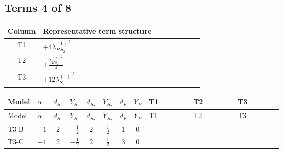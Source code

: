 \documentclass[8pt]{article}
\begin{document}
\begin{landscape}
\subsection*{Terms 4 of 8}
\begin{center}
\begin{tabular}{@{}c >{\raggedright\arraybackslash}p{0.82\linewidth}@{}}
\toprule
Column & Representative term structure \\
\midrule
T1 & \(\displaystyle +4 {\lambda_{HS_2}^{(1)}}^2\) \\
\midrule
T2 & \(\displaystyle +\frac{{\lambda_{HS_2}^{(A)}}^2}{4}\) \\
\midrule
T3 & \(\displaystyle +12 {\lambda_{S_2}^{(1)}}^2\) \\
\midrule
\bottomrule
\end{tabular}
\end{center}
\smallskip
\tiny
\begin{longtable}{@{}llcccccc >{\raggedright\arraybackslash}p{0.21\linewidth} >{\raggedright\arraybackslash}p{0.21\linewidth} >{\raggedright\arraybackslash}p{0.21\linewidth}@{}}
\toprule
Model & $\alpha$ & $d_{S_1}$ & $Y_{S_1}$ & $d_{S_2}$ & $Y_{S_2}$ & $d_F$ & $Y_F$ & T1 & T2 & T3 \\
\midrule
\endfirsthead
\toprule
Model & $\alpha$ & $d_{S_1}$ & $Y_{S_1}$ & $d_{S_2}$ & $Y_{S_2}$ & $d_F$ & $Y_F$ & T1 & T2 & T3 \\
\midrule
\endhead
T3-B & $-1$ & $2$ & $-\frac{1}{2}$ & $2$ & $\frac{1}{2}$ & $1$ & $0$ & \scriptsize\adjustbox{max width=\linewidth}{$\begin{gathered} +4 {\lambda_{HS_2}^{(1)}}^2\end{gathered}$} & \scriptsize\adjustbox{max width=\linewidth}{$\begin{gathered} +\frac{{\lambda_{HS_2}^{(A)}}^2}{4}\end{gathered}$} & \scriptsize\adjustbox{max width=\linewidth}{$\begin{gathered} +12 {\lambda_{S_2}^{(1)}}^2\end{gathered}$} \\
\midrule
T3-C & $-1$ & $2$ & $-\frac{1}{2}$ & $2$ & $\frac{1}{2}$ & $3$ & $0$ & \scriptsize\adjustbox{max width=\linewidth}{$\begin{gathered} +4 {\lambda_{HS_2}^{(1)}}^2\end{gathered}$} & \scriptsize\adjustbox{max width=\linewidth}{$\begin{gathered} +\frac{{\lambda_{HS_2}^{(A)}}^2}{4}\end{gathered}$} & \scriptsize\adjustbox{max width=\linewidth}{$\begin{gathered} +12 {\lambda_{S_2}^{(1)}}^2\end{gathered}$} \\

\end{longtable}
\end{landscape}
\end{document}
